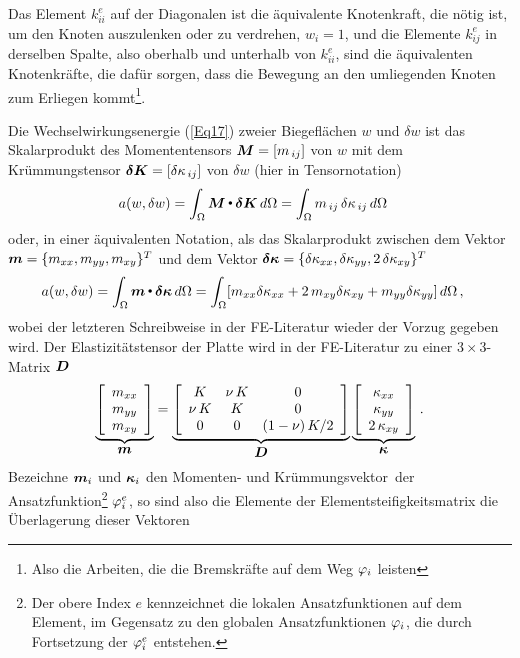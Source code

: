 Das Element $k_{ii}^e$ auf der Diagonalen ist die \"{a}quivalente Knotenkraft, die n\"{o}tig ist, um den Knoten auszulenken oder zu verdrehen, $w_i = 1$, und die Elemente $k_{ij}^e$ in derselben Spalte, also oberhalb und unterhalb von $k_{ii}^e$, sind die \"{a}quivalenten Knotenkr\"{a}fte, die daf\"{u}r sorgen, dass die Bewegung an den umliegenden Knoten zum Erliegen kommt\footnote{Also die Arbeiten, die die Bremskr\"{a}fte auf dem Weg $\Np_i$ leisten}.

Die Wechselwirkungsenergie (\ref{Eq17}) zweier Biegefl\"{a}chen $w$ und $ \delta w$ ist das Skalarprodukt des Momententensors $\vek M = [m_{\,ij}]$ von $w$ mit dem Kr\"{u}mmungstensor $\vek \delta\vek K = [\delta \kappa_{\,ij}]$ von $\delta w$ (hier in Tensornotation)
\begin{align}
a(w,\delta w) &= \int_{\Omega}\vek M \dotprod \vek  \delta \vek K
\,d\Omega= \int_{\Omega} m_{\,ij}\,\delta \kappa_{\,ij}\,d\Omega
 \end{align}
oder, in einer \"{a}quivalenten Notation, als das Skalarprodukt zwischen dem Vektor $\vek m =
\{m_{xx},m_{yy},m_{xy}\}^T$ und dem Vektor $\vek  \delta \vek \kappa =
\{\delta \kappa_{xx},\delta \kappa_{yy},2\,\delta \kappa_{xy}\}^T$
\begin{align}
a(w,\delta w) &=\int_{\Omega} \vek m \dotprod  \vek  \delta \vek \kappa \,d\Omega =
 \int_{\Omega}[m_{xx} \delta \kappa_{xx} + 2 \,m_{xy} \delta \kappa_{xy}
+ m_{yy} \delta \kappa_{yy}]\,d\Omega\,,
\end{align}
wobei der letzteren Schreibweise in der FE-Literatur wieder der Vorzug gegeben wird. Der Elastizit\"{a}tstensor der Platte wird in der FE-Literatur zu einer $3 \times 3$-Matrix
$\vek D$
\begin{align}\label{MatD}
\underbrace{\left[\barr {c} m_{xx} \\  m_{yy} \\  m_{xy} \earr\right]}_{\vek m} = \underbrace{\left [\barr {c c c} K & \nu \,K & 0 \\
\nu\,K & K & 0 \\ 0 & 0 & (1-\nu)\,K/2 \earr \right]}_{\vek D} \underbrace{\left[\barr {c} \kappa_{xx} \\
\kappa_{yy} \\  2\,\kappa_{xy} \earr\right]}_{\vek \kappa}\,.
\end{align}
Bezeichne $\vek m_i$ und $\vek \kappa_i$ den \glq Momenten\grq - und \glq Kr\"{u}mmungsvektor\grq\ der Ansatzfunktion\footnote{Der obere Index $e$ kennzeichnet die lokalen Ansatzfunktionen auf dem Element, im Gegensatz zu den globalen Ansatzfunktionen $\Np_i$, die durch Fortsetzung der $\Np_i^e$ entstehen.} $\Np_i^e $, so sind also die Elemente der Elementsteifigkeitsmatrix die \"{U}berlagerung dieser Vektoren
